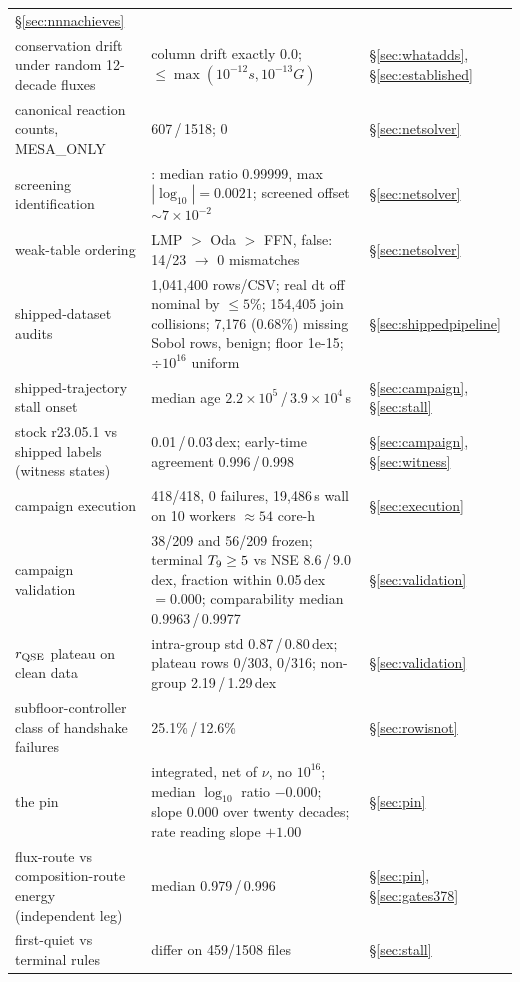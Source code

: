 \begin{longtable}{@{}L{6.4cm} L{5.0cm} L{3.2cm}@{}}
  \S\ref{sec:nnnachieves} \\
conservation drift under random 12-decade fluxes &
  column drift exactly 0.0; $\le \max(10^{-12}s, 10^{-13}G)$ &
  \S\ref{sec:whatadds}, \S\ref{sec:established} \\
canonical reaction counts, MESA\_ONLY &
  607\,/\,1518; 0 & \S\ref{sec:netsolver} \\
screening identification &
  : median ratio 0.99999, max $|\log_{10}| = 0.0021$;
  screened \kap{} offset ${\sim}7\times10^{-2}$ & \S\ref{sec:netsolver} \\
weak-table ordering &
  LMP $>$ Oda $>$ FFN,  false: 14/23 $\to$ 0 mismatches &
  \S\ref{sec:netsolver} \\
shipped-dataset audits &
  1,041,400 rows/CSV; real dt off nominal by $\le 5\%$; 154,405 join
  collisions; 7,176 (0.68\%) missing Sobol rows, benign; floor 1e-15;
  $\div 10^{16}$ uniform & \S\ref{sec:shippedpipeline} \\
shipped-trajectory stall onset &
  median age $2.2\times10^{5}$\,/\,$3.9\times10^{4}$\,s & \S\ref{sec:campaign},
  \S\ref{sec:stall} \\
stock r23.05.1 vs shipped labels (witness states) &
  0.01\,/\,0.03\,dex; early-time agreement 0.996\,/\,0.998 &
  \S\ref{sec:campaign}, \S\ref{sec:witness} \\
campaign execution &
  418/418, 0 failures, 19,486\,s wall on 10 workers ${\approx}54$ core-h &
  \S\ref{sec:execution} \\
campaign validation &
  38/209 and 56/209 frozen; terminal $T_{9} \ge 5$ vs NSE 8.6\,/\,9.0\,dex,
  fraction within 0.05\,dex $= 0.000$; comparability median 0.9963\,/\,0.9977 &
  \S\ref{sec:validation} \\
$r_{\mathrm{QSE}}$ plateau on clean data &
  intra-group std 0.87\,/\,0.80\,dex; plateau rows 0/303, 0/316; non-group
  2.19\,/\,1.29\,dex & \S\ref{sec:validation} \\
subfloor-controller class of handshake failures &
  25.1\%\,/\,12.6\% & \S\ref{sec:rowisnot} \\
the  pin &
  integrated, net of $\nu$, no $10^{16}$; median $\log_{10}$ ratio $-0.000$;
  slope 0.000 over twenty decades; rate reading slope $+1.00$ &
  \S\ref{sec:pin} \\
flux-route vs composition-route energy (independent leg) &
  median 0.979\,/\,0.996 & \S\ref{sec:pin}, \S\ref{sec:gates378} \\
first-quiet vs terminal rules &
  differ on 459/1508 files & \S\ref{sec:stall} \\

\end{longtable}
